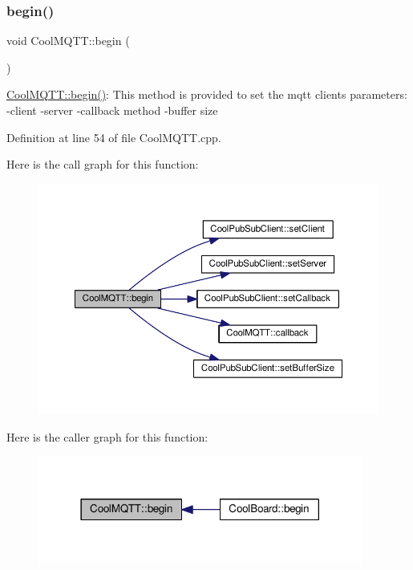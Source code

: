 \subsubsection{\texorpdfstring{begin()}{begin()}}
{\footnotesize\ttfamily void Cool\+M\+Q\+T\+T\+::begin (\begin{DoxyParamCaption}{ }\end{DoxyParamCaption})}

\hyperlink{class_cool_m_q_t_t_ac9248808641ebf3054ed0620ea9d0100}{Cool\+M\+Q\+T\+T\+::begin()}\+: This method is provided to set the mqtt client\textquotesingle{}s parameters\+: -\/client -\/server -\/callback method -\/buffer size 

Definition at line 54 of file Cool\+M\+Q\+T\+T.\+cpp.

Here is the call graph for this function\+:\nopagebreak
\begin{figure}[H]
\begin{center}
\leavevmode
\includegraphics[width=350pt]{class_cool_m_q_t_t_ac9248808641ebf3054ed0620ea9d0100_cgraph}
\end{center}
\end{figure}
Here is the caller graph for this function\+:\nopagebreak
\begin{figure}[H]
\begin{center}
\leavevmode
\includegraphics[width=302pt]{class_cool_m_q_t_t_ac9248808641ebf3054ed0620ea9d0100_icgraph}
\end{center}
\end{figure}
\mbox{\label{class_cool_m_q_t_t_a30d82ad665bfb603f46ecdbc290775df}} 
